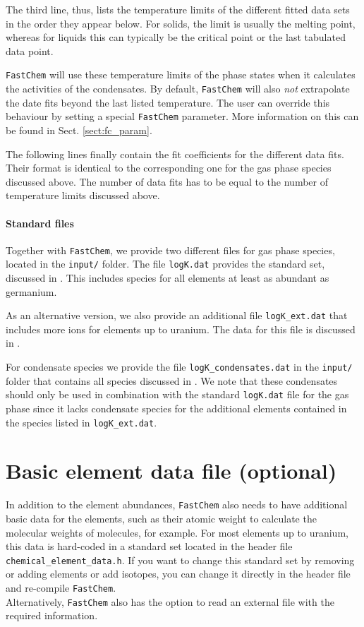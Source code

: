 \documentclass[numbers=noenddot]{aux/fcmanual}
\newcommand{\fc}{\texttt{FastChem}\xspace}
\begin{document}
The third line, thus, lists the temperature limits of the different fitted data sets in the order they appear below. For solids, the limit is usually the melting point, whereas for liquids this can typically be the critical point or the last tabulated data point. 

\fc will use these temperature limits of the phase states when it calculates the activities of the condensates. By default, \fc will also \textit{not} extrapolate the date fits beyond the last listed temperature. The user can override this behaviour by setting a special \fc parameter. More information on this can be found in Sect. \ref{sect:fc_param}.

The following lines finally contain the fit coefficients for the different data fits. Their format is identical to the corresponding one for the gas phase species discussed above. The number of data fits has to be equal to the number of temperature limits discussed above.

\paragraph{Standard files}
Together with \fc, we provide two different files for gas phase species, located in the \verb|input/| folder. The file \verb|logK.dat| provides the standard set, discussed in \citet{Stock2018MNRAS.479..865S}. This includes species for all elements at least as abundant as germanium.

As an alternative version, we also provide an additional file \verb|logK_ext.dat| that includes more ions for elements up to uranium. The data for this file is discussed in \citet{Hoeijmakers2019A&A...627A.165H}.

For condensate species we provide the file \verb|logK_condensates.dat| in the \verb|input/| folder that contains all species discussed in \citet{Kitzmann2023inprep}. We note that these condensates should only be used in combination with the standard \verb|logK.dat| file for the gas phase since it lacks condensate species for the additional elements contained in the species listed in \verb|logK_ext.dat|.


\newpage
\section{Basic element data file (optional)}
In addition to the element abundances, \fc also needs to have additional basic data for the elements, such as their atomic weight to calculate the molecular weights of molecules, for example. For most elements up to uranium, this data is hard-coded in a standard set located in the header file \verb|chemical_element_data.h|. If you want to change this standard set by removing or adding elements or add isotopes, you can change it directly in the header file and re-compile \fc.\\
Alternatively, \fc also has the option to read an external file with the required information.
\end{document}
